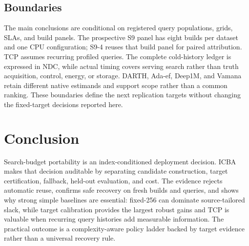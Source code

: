 \subsection{Boundaries}
The main conclusions are conditional on registered query populations, grids, SLAs, and build panels. The prospective S9 panel has eight builds per dataset and one CPU configuration; S9-4 reuses that build panel for paired attribution. TCP assumes recurring profiled queries. The complete cold-history ledger is expressed in NDC, while actual timing covers serving search rather than truth acquisition, control, energy, or storage. DARTH, Ada-ef, Deep1M, and Vamana retain different native estimands and support scope rather than a common ranking. These boundaries define the next replication targets without changing the fixed-target decisions reported here.

\section{Conclusion}
Search-budget portability is an index-conditioned deployment decision. ICBA makes that decision auditable by separating candidate construction, target certification, fallback, held-out evaluation, and cost. The evidence rejects automatic reuse, confirms safe recovery on fresh builds and queries, and shows why strong simple baselines are essential: fixed-256 can dominate source-tailored slack, while target calibration provides the largest robust gains and TCP is valuable when recurring query histories add measurable information. The practical outcome is a complexity-aware policy ladder backed by target evidence rather than a universal recovery rule.
